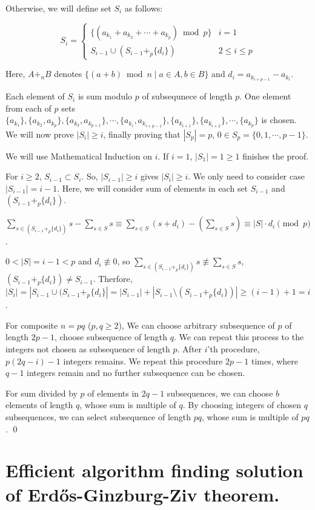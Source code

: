 \documentclass[11pt]{article}
\newcommand{\EGZT}{Erd\H{o}s-Ginzburg-Ziv theorem}
\begin{document}
Otherwise, we will define set $S_i$ as follows:

$$ S_i = \begin{cases}
\{(a_{k_1} + a_{k_2} + \cdots + a_{k_p}) \bmod p \} & i = 1 \\
S_{i-1} \cup (S_{i-1} +_p \{d_i\}) & 2 \le i \le p
\end{cases}$$

Here, $A +_n B$ denotes $\{(a+b) \bmod n \mid a \in A, b \in B \}$ and $d_i = a_{k_{i+p-1}} - a_{k_i}$.

Each element of $S_i$ is sum modulo $p$ of subsequnece of length $p$. One element from each of $p$ sets $\{a_{k_1}\}, \{a_{k_2}, a_{k_p}\}, \{a_{k_3}, a_{k_{p+1}} \}, \cdots, \{a_{k_i}, a_{k_{i+p-1}}\}, \{a_{k_{i+1}}\}, \{a_{k_{i+2}}\}, \cdots, \{a_{k_p}\}$ is chosen. We will now prove $|S_i| \ge i$, finally proving that $|S_p| = p$, $0 \in S_p = \{0, 1, \cdots, p-1\}$.

We will use Mathematical Induction on $i$. If $i=1$, $|S_1| = 1 \ge 1$ finishes the proof.

For $i \ge 2$, $S_{i-1} \subset S_i$. So, $|S_{i-1}| \ge i$ gives $|S_i| \ge i$. We only need to consider case $|S_{i-1}| = i-1$. Here, we will consider sum of elements in each set $S_{i-1}$ and $(S_{i-1} +_p \{d_i\})$.

$\sum_{s \in (S_{i-1} +_p \{d_i\})} s - \sum_{s \in S} s \equiv \sum_{s \in S} (s + d_i) - (\sum_{s \in S} s) \equiv |S| \cdot d_i \pmod{p}$.

$0 < |S| = i-1 < p$ and $d_i \not \equiv 0$, so $\sum_{s \in (S_{i-1} +_p \{d_i\})} s \not \equiv \sum_{s \in S} s$, $(S_{i-1} +_p \{d_i\}) \ne S_{i-1}$. Therfore, $|S_i| = |S_{i-1} \cup (S_{i-1} +_p \{d_i\}| = |S_{i-1}| + |S_{i-1} \setminus (S_{i-1} +_p \{d_i\})| \ge (i-1) + 1 = i$.

For composite $n = pq$ ($p, q \ge 2$), We can choose arbitrary subsequence of $p$ of length $2p-1$, choose subsequence of length $q$. We can repeat this process to the integers not chosen as subsequence of length $p$. After $i$'th procedure, $p(2q-i)-1$ integers remains. We repeat this procedure $2p-1$ times, where $q-1$ integers remain and no further subsequence can be chosen.

For sum divided by $p$ of elements in $2q-1$ subsequences, we can choose $b$ elements of length $q$, whose sum is multiple of $q$. By choosing integers of chosen $q$ subsequences, we can select subsequence of length $pq$, whose sum is multiple of $pq$. \qed


\section{Efficient algorithm finding solution of \EGZT.}
\end{document}
